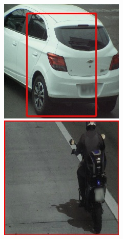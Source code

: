 \documentclass[12pt,oneside]{memoir}
\begin{document}
\begin{figure}
\begin{subfigure}[b]{0.35\textwidth}
    \end{subfigure}
    ~
    \begin{subfigure}[b]{0.35\textwidth}
        \includegraphics[width=\textwidth]{matfmaster/vgg16_base/car_pred.jpg}
        \includegraphics[width=\textwidth]{matfmaster/vgg16_base/motorbike_pred.jpg}

\end{subfigure}
\end{figure}
\end{document}
